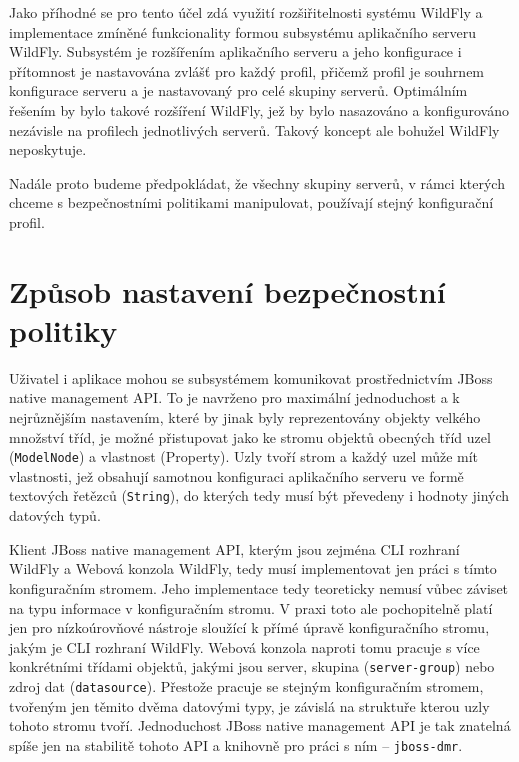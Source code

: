 Jako příhodné se pro tento účel zdá využití rozšiřitelnosti systému WildFly a implementace zmíněné funkcionality formou subsystému aplikačního serveru WildFly. Subsystém je rozšířením aplikačního serveru a jeho konfigurace i přítomnost je nastavována zvlášť pro každý profil, přičemž profil je souhrnem konfigurace serveru a je nastavovaný pro celé skupiny serverů. Optimálním řešením by bylo takové rozšíření WildFly, jež by bylo nasazováno a konfigurováno nezávisle na profilech jednotlivých serverů. Takový koncept ale bohužel WildFly neposkytuje.

Nadále proto budeme předpokládat, že všechny skupiny serverů, v rámci kterých chceme s bezpečnostními politikami manipulovat, používají stejný konfigurační profil.

\section{Způsob nastavení bezpečnostní politiky}

Uživatel i aplikace mohou se subsystémem komunikovat prostřednictvím JBoss native management API. To je navrženo pro maximální jednoduchost a k nejrůznějším nastavením, které by jinak byly reprezentovány objekty velkého množství tříd, je možné přistupovat jako ke stromu objektů obecných tříd uzel ({\tt ModelNode}) a vlastnost (Property). Uzly tvoří strom a každý uzel může mít vlastnosti, jež obsahují samotnou konfiguraci aplikačního serveru ve formě textových řetězců ({\tt String}), do kterých tedy musí být převedeny i hodnoty jiných datových typů. \cite{jbossDetypedManagement}

Klient JBoss native management API, kterým jsou zejména CLI rozhraní WildFly a Webová konzola WildFly, tedy musí implementovat jen práci s tímto konfiguračním stromem. Jeho implementace tedy teoreticky nemusí vůbec záviset na typu informace v konfiguračním stromu. V praxi toto ale pochopitelně platí jen pro nízkoúrovňové nástroje sloužící k přímé úpravě konfiguračního stromu, jakým je CLI rozhraní WildFly. Webová konzola naproti tomu pracuje s více konkrétními třídami objektů, jakými jsou server, skupina ({\tt server-group}) nebo zdroj dat ({\tt datasource}). Přestože pracuje se stejným konfiguračním stromem, tvořeným jen těmito dvěma datovými typy, je závislá na struktuře kterou uzly tohoto stromu tvoří. Jednoduchost JBoss native management API je tak znatelná spíše jen na stabilitě tohoto API a knihovně pro práci s ním -- {\tt jboss-dmr}. \cite{jbossDetypedManagement}

